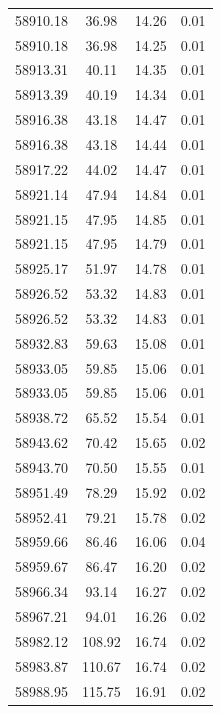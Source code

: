 \begin{longtable}{|c|c|c|c|}
 58910.18 &   36.98 &       14.26 &          0.01 \\
 58910.18 &   36.98 &       14.25 &          0.01 \\
 58913.31 &   40.11 &       14.35 &          0.01 \\
 58913.39 &   40.19 &       14.34 &          0.01 \\
 58916.38 &   43.18 &       14.47 &          0.01 \\
 58916.38 &   43.18 &       14.44 &          0.01 \\
 58917.22 &   44.02 &       14.47 &          0.01 \\
 58921.14 &   47.94 &       14.84 &          0.01 \\
 58921.15 &   47.95 &       14.85 &          0.01 \\
 58921.15 &   47.95 &       14.79 &          0.01 \\
 58925.17 &   51.97 &       14.78 &          0.01 \\
 58926.52 &   53.32 &       14.83 &          0.01 \\
 58926.52 &   53.32 &       14.83 &          0.01 \\
 58932.83 &   59.63 &       15.08 &          0.01 \\
 58933.05 &   59.85 &       15.06 &          0.01 \\
 58933.05 &   59.85 &       15.06 &          0.01 \\
 58938.72 &   65.52 &       15.54 &          0.01 \\
 58943.62 &   70.42 &       15.65 &          0.02 \\
 58943.70 &   70.50 &       15.55 &          0.01 \\
 58951.49 &   78.29 &       15.92 &          0.02 \\
 58952.41 &   79.21 &       15.78 &          0.02 \\
 58959.66 &   86.46 &       16.06 &          0.04 \\
 58959.67 &   86.47 &       16.20 &          0.02 \\
 58966.34 &   93.14 &       16.27 &          0.02 \\
 58967.21 &   94.01 &       16.26 &          0.02 \\
 58982.12 &  108.92 &       16.74 &          0.02 \\
 58983.87 &  110.67 &       16.74 &          0.02 \\
 58988.95 &  115.75 &       16.91 &          0.02 \\

\end{longtable}
